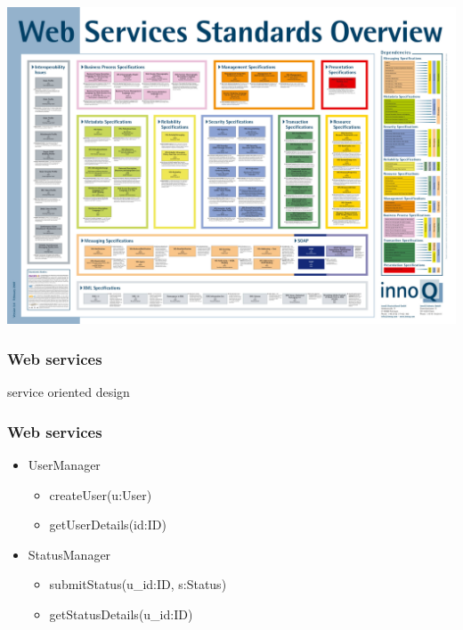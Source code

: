 \begin{frame}[plain]
  \begin{changemargin}{-1cm}{-1cm}
    \begin{center}
      \includegraphics[width=\paperwidth, height=\paperheight, keepaspectratio]{images/WS-Standards-Poster.jpg}
    \end{center}
  \end{changemargin}
\end{frame}

\begin{frame}
  \frametitle{Web services}
  \begin{center}
    service oriented design
  \end{center}
\end{frame}

\begin{frame}
  \frametitle{Web services}
  \begin{itemize}
  \item UserManager
    \begin{itemize}
    \item createUser(u:User)
    \item getUserDetails(id:ID)
    \end{itemize}
  \item StatusManager
    \begin{itemize}
    \item submitStatus(u\_id:ID, s:Status)
    \item getStatusDetails(u\_id:ID)
    \end{itemize}
  \end{itemize}
\end{frame}

